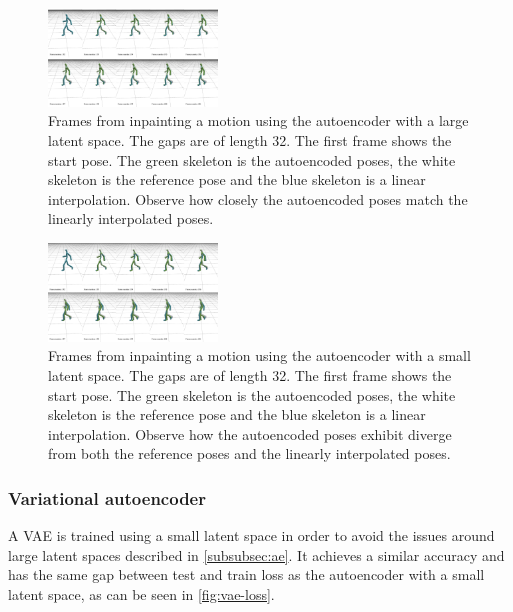\begin{figure}[H]
\centering
\includegraphics[width=0.4\textwidth]{img/ae-large-inpainting}
\caption{Frames from inpainting a motion using the autoencoder with a large latent space. The gaps are of length 32. The first frame shows the start pose. The green skeleton is the autoencoded poses, the white skeleton is the reference pose and the blue skeleton is a linear interpolation. Observe how closely the autoencoded poses match the linearly interpolated poses.}
\label{fig:ae-large-inpainting}
\end{figure}

\begin{figure}[H]
\centering
\includegraphics[width=0.4\textwidth]{img/ae-small-inpainting}
\caption{Frames from inpainting a motion using the autoencoder with a small latent space. The gaps are of length 32. The first frame shows the start pose. The green skeleton is the autoencoded poses, the white skeleton is the reference pose and the blue skeleton is a linear interpolation. Observe how the autoencoded poses exhibit diverge from both the reference poses and the linearly interpolated poses.}
\label{fig:ae-small-inpainting}
\end{figure}

\newpage





\subsubsection{Variational autoencoder}\label{subsubsec:vae}
A VAE is trained using a small latent space in order to avoid the issues around large latent spaces described in \ref{subsubsec:ae}. It achieves a similar accuracy and has the same gap between test and train loss as the autoencoder with a small latent space, as can be seen in \autoref{fig:vae-loss}.

